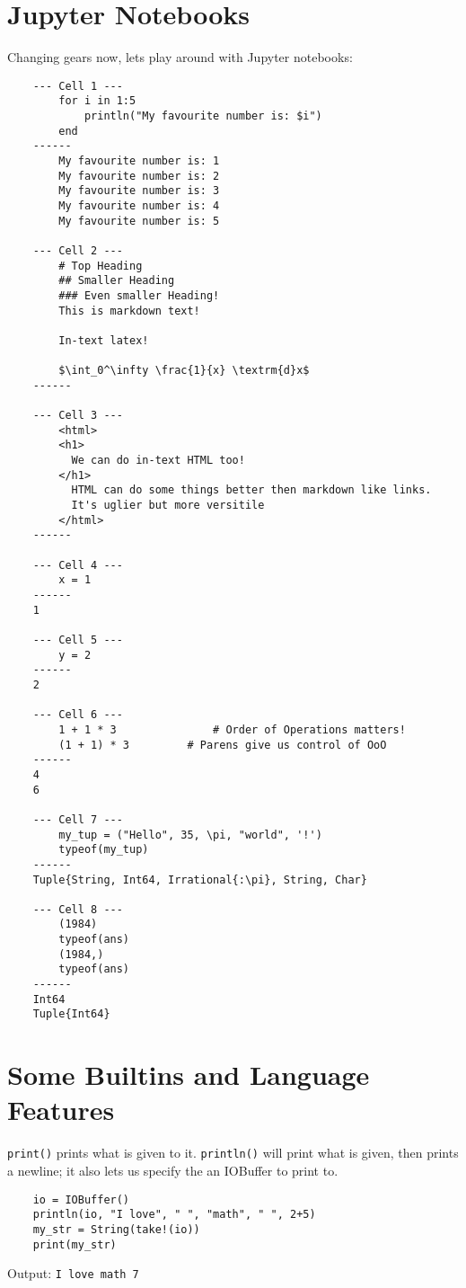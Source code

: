 \documentclass{report}
\begin{document}
\section{Jupyter Notebooks}
Changing gears now, lets play around with Jupyter notebooks:
\begin{verbatim}
	--- Cell 1 ---
		for i in 1:5
			println("My favourite number is: $i")
		end
	------
		My favourite number is: 1
		My favourite number is: 2
		My favourite number is: 3
		My favourite number is: 4
		My favourite number is: 5

	--- Cell 2 ---
		# Top Heading
		## Smaller Heading
		### Even smaller Heading!
		This is markdown text!

		In-text latex!
		
		$\int_0^\infty \frac{1}{x} \textrm{d}x$
	------

	--- Cell 3 ---
		<html>
		<h1>
		  We can do in-text HTML too!
		</h1>
		  HTML can do some things better then markdown like links.
		  It's uglier but more versitile 
		</html>
	------

	--- Cell 4 ---
		x = 1
	------
	1

	--- Cell 5 ---
		y = 2
	------
	2

	--- Cell 6 ---
		1 + 1 * 3				# Order of Operations matters!
		(1 + 1) * 3			# Parens give us control of OoO
	------
	4
	6

	--- Cell 7 ---
		my_tup = ("Hello", 35, \pi, "world", '!')
		typeof(my_tup)
	------
	Tuple{String, Int64, Irrational{:\pi}, String, Char}

	--- Cell 8 ---
		(1984)
		typeof(ans)
		(1984,)
		typeof(ans)
	------
	Int64
	Tuple{Int64}
\end{verbatim}


\section{Some Builtins and Language Features}
\verb|print()| prints what is given to it. \verb|println()| will print what is given, then prints a newline; it also lets us specify the an IOBuffer to print to.

\begin{lstlisting}
	io = IOBuffer()
	println(io, "I love", " ", "math", " ", 2+5)
	my_str = String(take!(io))
	print(my_str)
\end{lstlisting}
Output: \verb|I love math 7|
\end{document}
